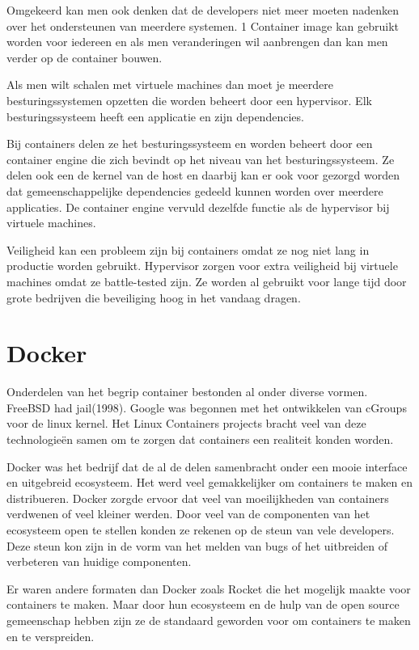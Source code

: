 \documentclass[pdftex,a4paper,12pt,twoside]{report}
\begin{document}
Omgekeerd kan men ook denken dat de developers niet meer moeten nadenken over het ondersteunen van meerdere systemen. 1 Container image kan gebruikt worden voor iedereen en als men veranderingen wil aanbrengen dan kan men verder op de container bouwen. 

Als men wilt schalen met virtuele machines dan moet je meerdere besturingssystemen opzetten die worden beheert door een hypervisor. Elk besturingssysteem heeft een applicatie en zijn dependencies.

Bij containers delen ze het besturingssysteem en worden beheert door een container engine die zich bevindt op het niveau van het besturingssysteem. Ze delen ook een de kernel van de host en daarbij kan er ook voor gezorgd worden dat gemeenschappelijke dependencies gedeeld kunnen worden over meerdere applicaties. De container engine vervuld dezelfde functie als de hypervisor bij virtuele machines. 

Veiligheid kan een probleem zijn bij containers omdat ze nog niet lang in productie worden gebruikt. Hypervisor zorgen voor extra veiligheid bij virtuele machines omdat ze battle-tested zijn. Ze worden al gebruikt voor lange tijd door grote bedrijven die beveiliging hoog in het vandaag dragen.

\section{Docker}

Onderdelen van het begrip container bestonden al onder diverse vormen. FreeBSD had jail(1998). Google was begonnen met het ontwikkelen van cGroups voor de linux kernel. Het Linux Containers projects bracht veel van deze technologieën samen om te zorgen dat containers een realiteit konden worden.

Docker was het bedrijf dat de al de delen samenbracht onder een mooie interface en uitgebreid ecosysteem. Het werd veel gemakkelijker om containers te maken en distribueren. Docker zorgde ervoor dat veel van moeilijkheden van containers verdwenen of veel kleiner werden. Door veel van de componenten van het ecosysteem open te stellen konden ze rekenen op de steun van vele developers. Deze steun kon zijn in de vorm van het melden van bugs of het uitbreiden of verbeteren van huidige componenten. 

Er waren andere formaten dan Docker zoals Rocket die het mogelijk maakte voor containers te maken. Maar door hun ecosysteem en de hulp van de open source gemeenschap hebben zijn ze de standaard geworden voor om containers te maken en te verspreiden.
\end{document}
